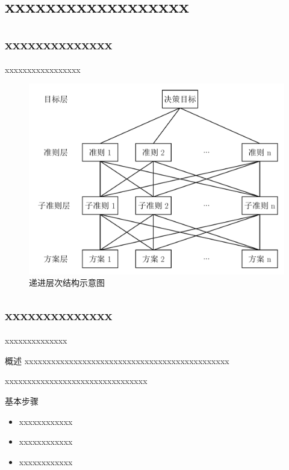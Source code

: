 \documentclass{beamer}
\begin{document}
\section{xxxxxxxxxxxxxxxxxx}

\subsection{xxxxxxxxxxxxxx}

\begin{frame}{xxxxxxxxxxxxxxxxx}
		\begin{figure}[h]
	\centering
	\includegraphics[height=0.76\textheight,trim=0 0 0 0,clip]{pic/递进层次结构示意图.pdf}
	\caption{递进层次结构示意图}
\end{figure}
\end{frame}

\subsection{xxxxxxxxxxxxxx}

\begin{frame}{xxxxxxxxxxxxxx}
	\begin{block}{概述}
	xxxxxxxxxxxxxxxxxxxxxxxxxxxxxxxxxxxxxxxxxxxxxx
	
	xxxxxxxxxxxxxxxxxxxxxxxxxxxxxxxx
	\end{block}
\begin{block}{基本步骤}
\begin{itemize}
	\item xxxxxxxxxxxx
	\item xxxxxxxxxxxx
	\item xxxxxxxxxxxx
\end{itemize}
\end{block}


\end{frame}
\end{document}
